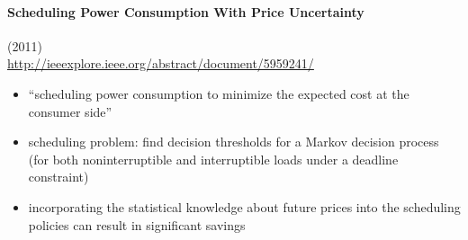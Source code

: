 \documentclass{article}
\begin{document}
\paragraph{Scheduling Power Consumption With Price Uncertainty} (2011)
\cite{kim2011scheduling} \\
\url{http://ieeexplore.ieee.org/abstract/document/5959241/}
\begin{itemize}
\item ``scheduling power consumption to minimize the expected cost at the consumer side''
\item scheduling problem: find decision thresholds for a Markov decision process (for both noninterruptible and interruptible loads under a deadline constraint)
\item incorporating the statistical knowledge about future prices into the scheduling policies can result in significant savings
\end{itemize}



\end{document}
